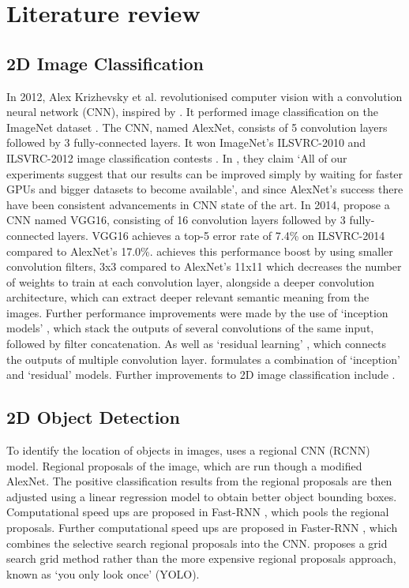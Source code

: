 \documentclass[11pt]{article}
\begin{document}
\section{Literature review}
\subsection*{2D Image Classification}
In 2012, Alex Krizhevsky et al. revolutionised computer vision with a convolution neural network (CNN), inspired by \cite{Yann}. It performed image classification on the ImageNet dataset \cite{ILSVRC15}. The CNN, named AlexNet, consists of 5 convolution layers followed by 3 fully-connected layers. It won ImageNet's ILSVRC-2010 and ILSVRC-2012 image classification contests \cite{alex_net}. In \cite{alex_net}, they claim `All of our experiments suggest that our results can be improved simply by waiting for faster GPUs and bigger datasets to become available', and since AlexNet's success there have been consistent advancements in CNN state of the art. In 2014, \cite{VGG16} propose a CNN named VGG16, consisting of 16 convolution layers followed by 3 fully-connected layers. VGG16 achieves a top-5 error rate of 7.4\% on ILSVRC-2014 compared to AlexNet's 17.0\%. \cite{VGG16} achieves this performance boost by using smaller convolution filters, 3x3 compared to AlexNet's 11x11 which decreases the number of weights to train at each convolution layer, alongside a deeper convolution architecture, which can extract deeper relevant semantic meaning from the images. Further performance improvements were made by the use of `inception models' \cite{inception}\cite{inceptionV2}, which stack the outputs of several convolutions of the same input, followed by filter concatenation. As well as `residual learning' \cite{ResNet}, which connects the outputs of multiple convolution layer. \cite{Incep_ResNet} formulates a combination of `inception' and `residual' models. Further improvements to 2D image classification include \cite{neural_search} \cite{scaleable_image}.

\subsection*{2D Object Detection}
To identify the location of objects in images, \cite{RNN} uses a regional CNN (RCNN) model. Regional proposals of the image, which are run though a modified AlexNet. The positive classification results from the regional proposals are then adjusted using a linear regression model to obtain better object bounding boxes. Computational speed ups are proposed in Fast-RNN \cite{fast_RNN}, which pools the regional proposals. Further computational speed ups are proposed in Faster-RNN \cite{faster_RNN}, which combines the selective search regional proposals into the CNN. \cite{YOLO} proposes a grid search grid method rather than the more expensive regional proposals approach, known as `you only look once' (YOLO).
\end{document}

